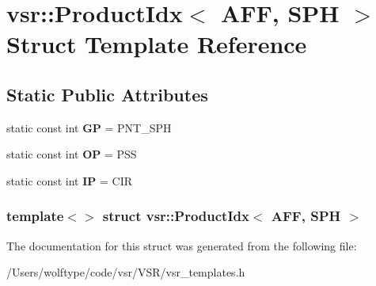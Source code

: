 \hypertarget{structvsr_1_1_product_idx_3_01_a_f_f_00_01_s_p_h_01_4}{\section{vsr\-:\-:Product\-Idx$<$ A\-F\-F, S\-P\-H $>$ Struct Template Reference}
\label{structvsr_1_1_product_idx_3_01_a_f_f_00_01_s_p_h_01_4}
}
\subsection*{Static Public Attributes}
\begin{DoxyCompactItemize}
\item 
\hypertarget{structvsr_1_1_product_idx_3_01_a_f_f_00_01_s_p_h_01_4_ae10e4970b82ec2fc11182ee97194ab34}{static const int {\bfseries G\-P} = P\-N\-T\-\_\-\-S\-P\-H}\label{structvsr_1_1_product_idx_3_01_a_f_f_00_01_s_p_h_01_4_ae10e4970b82ec2fc11182ee97194ab34}

\item 
\hypertarget{structvsr_1_1_product_idx_3_01_a_f_f_00_01_s_p_h_01_4_a670a88d7b255344d0871a8889bcced9e}{static const int {\bfseries O\-P} = P\-S\-S}\label{structvsr_1_1_product_idx_3_01_a_f_f_00_01_s_p_h_01_4_a670a88d7b255344d0871a8889bcced9e}

\item 
\hypertarget{structvsr_1_1_product_idx_3_01_a_f_f_00_01_s_p_h_01_4_a47c1a77d1b50dbfb08c31d45d90c6764}{static const int {\bfseries I\-P} = C\-I\-R}\label{structvsr_1_1_product_idx_3_01_a_f_f_00_01_s_p_h_01_4_a47c1a77d1b50dbfb08c31d45d90c6764}

\end{DoxyCompactItemize}
\subsubsection*{template$<$$>$ struct vsr\-::\-Product\-Idx$<$ A\-F\-F, S\-P\-H $>$}



The documentation for this struct was generated from the following file\-:\begin{DoxyCompactItemize}
\item 
/\-Users/wolftype/code/vsr/\-V\-S\-R/vsr\-\_\-templates.\-h\end{DoxyCompactItemize}
